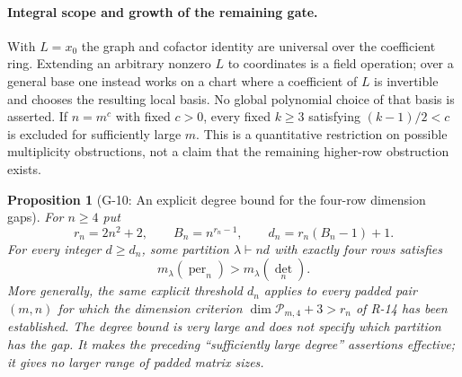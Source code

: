 \documentclass[11pt,a4paper]{article}
\newtheorem{proposition}{Proposition}
\theoremstyle{definition}\newtheorem{definition}{Definition}
\begin{document}
\paragraph{Integral scope and growth of the remaining gate.}
With $L=x_0$ the graph and cofactor identity are universal over the coefficient ring. Extending an arbitrary nonzero $L$ to coordinates is a field operation; over a general base one instead works on a chart where a coefficient of $L$ is invertible and chooses the resulting local basis. No global polynomial choice of that basis is asserted. If $n=m^c$ with fixed $c>0$, every fixed $k\geq3$ satisfying $(k-1)/2<c$ is excluded for sufficiently large $m$. This is a quantitative restriction on possible multiplicity obstructions, not a claim that the remaining higher-row obstruction exists.
\begin{proposition}[G-10: An explicit degree bound for the four-row dimension gaps]\label{G-10}
For $n\geq4$ put
\[
 r_n=2n^2+2,\qquad B_n=n^{r_n-1},\qquad
 d_n=r_n(B_n-1)+1.
\]
For every integer $d\geq d_n$, some partition $\lambda\vdash nd$
with exactly four rows satisfies
\[
 m_\lambda(\operatorname{per}_n)>m_\lambda(\det_n).
\]
More generally, the same explicit threshold $d_n$ applies to every
padded pair $(m,n)$ for which the dimension criterion
$\dim\mathcal P_{m,4}+3>r_n$ of R-14 has been established.
The degree bound is very large and does not specify which partition
has the gap. It makes the preceding ``sufficiently large degree''
assertions effective; it gives no larger range of padded matrix sizes.
\end{proposition}
\end{document}

